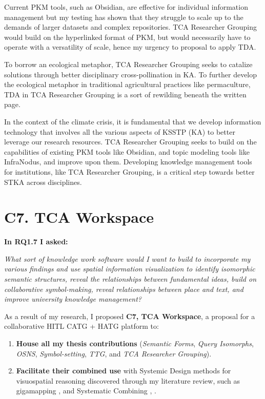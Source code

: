 Current PKM tools, such as Obsidian, are effective for individual information management but my testing has shown that they struggle to scale up to the demands of larger datasets and complex repositories. TCA Researcher Grouping would build on the hyperlinked format of PKM, but would necessarily have to operate with a versatility of scale, hence my urgency to proposal to apply TDA. 

To borrow an ecological metaphor, TCA Researcher Grouping seeks to catalize solutions through better disciplinary cross-pollination in KA. To further develop the ecological metaphor in traditional agricultural practices like permaculture, TDA in TCA Researcher Grouping is a sort of rewilding beneath the written page. 

In the context of the climate crisis, it is fundamental that we develop information technology that involves all the various aspects of KSSTP (KA) to better leverage our research resources. TCA Researcher Grouping seeks to build on the capabilities of existing PKM tools like Obsidian, and topic modeling tools like InfraNodus, and improve upon them. Developing knowledge management tools for institutions, like TCA Researcher Grouping, is a critical step towards better STKA across disciplines. 
\section{C7. TCA Workspace}
\noindent\textbf{In RQ1.7 I asked:}

\textit{What sort of knowledge work software would I want to build to incorporate my various findings and use spatial information visualization to identify isomorphic semantic structures, reveal the relationships between fundamental ideas, build on collaborative symbol-making, reveal relationships between place and text, and improve university knowledge management?}

As a result of my research, I proposed \textbf{C7, TCA Workspace}, a proposal for a collaborative HITL CATG + HATG platform to:

\begin{enumerate}[label=\textbf{(\alph*)}, leftmargin=2em]
    \item \textbf{House all my thesis contributions} (\textit{Semantic Forms}, \textit{Query Isomorphs}, \textit{OSNS}, \textit{Symbol-setting}, \textit{TTG}, and \textit{TCA Researcher Grouping}).
    \item \textbf{Facilitate their combined use} with Systemic Design methods for visuospatial reasoning discovered through my literature review, such as gigamapping \citep{sevaldson_giga-mapping_2011}, \citep[p.~26]{sevaldson_designing_2022} and Systematic Combining \citep[p.~554]{dubois_systematic_2002}, \citep{kjode_entanglement_2024}.
\end{enumerate}

